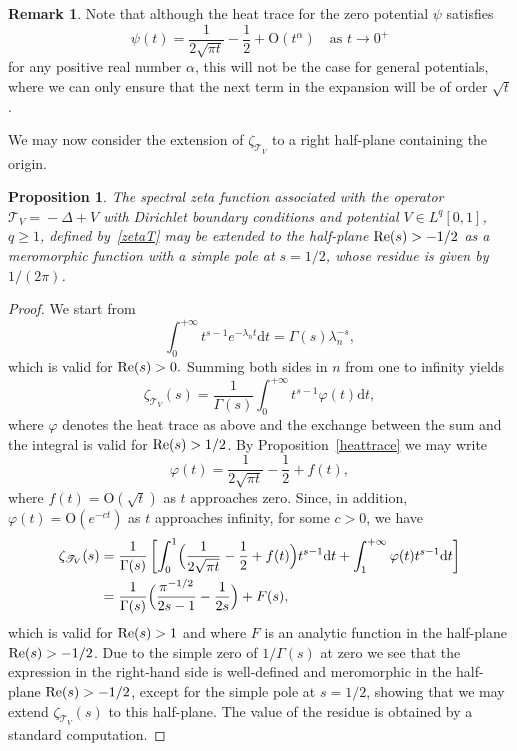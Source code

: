 \documentclass[11pt]{article}
\theoremstyle{plain}
\newtheorem{prop}[theorem]{Proposition}
\theoremstyle{definition}
\newtheorem{remark}[theorem]{Remark}
\newcommand{\bo}{\mathrm{O}}
\newcommand{\ttt}{\mathscr{T}}
\renewcommand{\d}{\mathrm{d}}
\let\balpha q
\let\fr\frac
\begin{document}
\begin{remark}
Note that although the heat trace for the zero potential $\psi$ satisfies
\[
\psi(t)=\frac{1}{2\sqrt{\pi t}} - \frac{1}{2} + \bo(t^{\alpha}) \quad\text{as } t\to 0^{+}
\]
for any positive real number $\alpha$, this will not be the case for general potentials, where we can only ensure that the next term in the expansion
will be of order $\sqrt{t}$.
\end{remark}

We may now consider the extension of $\zeta_{\ttt_V}$ to a right half-plane containing the origin.

\begin{prop}\label{meromorphicext}
The spectral zeta function associated with the operator \hbox{$\!\ttt_V\!=\!-\Delta\!+\!V$} with Dirichlet boundary conditions and potential $V\in L^{\balpha}[0,1]$, $\balpha\geq 1$,
defined by~\eqref{zetaT} may be extended to the half-plane $\re(s)>-1/2$ as a meromorphic function with a simple pole at $s=1/2$, whose residue is
given by $1/(2\pi)$.
\end{prop}
\begin{proof}
We start from
\[
\int_{0}^{+\infty} t^{s-1} e^{-\lambda_{n}t} \d t = \Gamma(s) \lambda_{n}^{-s},
\]
which is valid for $\re(s)>0.$ Summing both sides in $n$ from one to infinity yields
\[
\zeta_{\ttt_V}(s) = \fr{1}{\Gamma(s)} \int_{0}^{+\infty} t^{s-1} \varphi(t) \d t,
\]
where $\varphi$ denotes the heat trace as above and the exchange between the sum and the integral is valid for $\re(s)>1/2$.
By Proposition~\ref{heattrace} we may write
\[
\varphi(t) = \frac{1}{2\sqrt{\pi t}} - \frac{1}{2} + f(t),
\]
where $f(t) = \bo(\sqrt{t})$ as $t$ approaches zero. Since, in addition, $\varphi(t) = \bo(e^{-ct})$ as $t$ approaches infinity, for some $c>0$, we have
\begin{align*}
\zeta_{\ttt_V}(s) & = \fr{1}{\Gamma(s)}\left[ \int_{0}^{1} \Bigl(\frac{1}{2\sqrt{\pi t}} - \frac{1}{2} + f(t) \Bigr) t^{s-1} \d t +
\int_{1}^{+\infty} \varphi(t) t^{s-1} \d t\right]\\
& = \fr{1}{\Gamma(s)}\Bigl(\fr{\pi^{-1/2}}{2s-1} -\fr{1}{2s} \Bigr) + F(s),
\end{align*}
which is valid for $\re(s)>1$ and where $F$ is an analytic function in the half-plane $\re(s)>-1/2$. Due to the simple zero of $1/\Gamma(s)$
at zero we see that the expression in the right-hand side is well-defined and meromorphic in the half-plane $\re(s)>-1/2$, except for the
simple pole at $s=1/2$, showing that we may extend $\zeta_{\ttt_V}(s)$ to this half-plane. The value of the residue is obtained by a
standard computation.
\end{proof}
\end{document}

